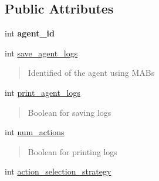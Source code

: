 \subsection*{Public Attributes}
\begin{DoxyCompactItemize}
\item 
\mbox{\label{classMultiArmedBandit_ab6bcacc3a702c2ac9e06c6d8c552feb8}} 
int {\bfseries agent\+\_\+id}
\item 
\mbox{\label{classMultiArmedBandit_a78201d6ae72bf4f77321f3f94c7a2896}} 
int \hyperlink{classMultiArmedBandit_a78201d6ae72bf4f77321f3f94c7a2896}{save\+\_\+agent\+\_\+logs}
\begin{DoxyCompactList}\small\item\em \begin{quote}
Identified of the agent using M\+A\+Bs \end{quote}
\end{DoxyCompactList}\item 
\mbox{\label{classMultiArmedBandit_a67e7a58b5c0b66daa12bad25b7881f9c}} 
int \hyperlink{classMultiArmedBandit_a67e7a58b5c0b66daa12bad25b7881f9c}{print\+\_\+agent\+\_\+logs}
\begin{DoxyCompactList}\small\item\em \begin{quote}
Boolean for saving logs \end{quote}
\end{DoxyCompactList}\item 
\mbox{\label{classMultiArmedBandit_a8806e1f73ec7dca2def562d31a202456}} 
int \hyperlink{classMultiArmedBandit_a8806e1f73ec7dca2def562d31a202456}{num\+\_\+actions}
\begin{DoxyCompactList}\small\item\em \begin{quote}
Boolean for printing logs \end{quote}
\end{DoxyCompactList}\item 
\mbox{\label{classMultiArmedBandit_ad8ba8903eb2546cb68b8b18fa017df89}} 
int \hyperlink{classMultiArmedBandit_ad8ba8903eb2546cb68b8b18fa017df89}{action\+\_\+selection\+\_\+strategy}
\begin{DoxyCompactList}\small\item\em \begin{quote}

\end{quote}
\end{DoxyCompactList}
\end{DoxyCompactItemize}
